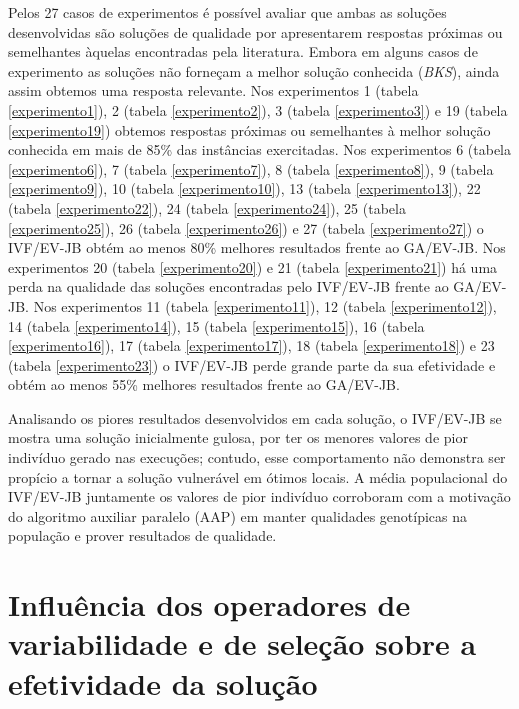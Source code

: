 \documentclass[relatorio,nocolorlinks]{inf-ufg}
\begin{document}
Pelos 27 casos de experimentos \'{e} poss\'{i}vel avaliar que ambas as solu\c{c}\~{o}es desenvolvidas s\~{a}o solu\c{c}\~{o}es de qualidade por
apresentarem respostas pr\'{o}ximas ou semelhantes \`{a}quelas encontradas pela literatura. Embora em alguns casos de experimento as solu\c{c}\~{o}es
n\~{a}o forne\c{c}am a melhor solu\c{c}\~{a}o conhecida (\textit{BKS}), ainda assim obtemos uma resposta relevante. Nos experimentos 1 (tabela
\ref{experimento1}), 2 (tabela \ref{experimento2}), 3 (tabela \ref{experimento3}) e 19 (tabela \ref{experimento19}) obtemos respostas pr\'{o}ximas
ou semelhantes \`{a} melhor solu\c{c}\~{a}o conhecida em mais de 85\% das inst\^{a}ncias exercitadas. Nos experimentos 6 (tabela \ref{experimento6}),
7 (tabela \ref{experimento7}), 8 (tabela \ref{experimento8}), 9 (tabela \ref{experimento9}), 10 (tabela \ref{experimento10}), 13 (tabela
\ref{experimento13}), 22 (tabela \ref{experimento22}), 24 (tabela \ref{experimento24}), 25 (tabela \ref{experimento25}), 26 (tabela
\ref{experimento26}) e 27 (tabela \ref{experimento27}) o IVF/EV-JB obt\'{e}m ao menos 80\% melhores resultados frente ao GA/EV-JB. Nos experimentos
20 (tabela \ref{experimento20}) e 21 (tabela \ref{experimento21}) h\'{a} uma perda na qualidade das solu\c{c}\~{o}es encontradas pelo IVF/EV-JB
frente ao GA/EV-JB. Nos experimentos 11 (tabela \ref{experimento11}), 12 (tabela \ref{experimento12}), 14 (tabela \ref{experimento14}), 15 (tabela
\ref{experimento15}), 16 (tabela \ref{experimento16}), 17 (tabela \ref{experimento17}), 18 (tabela \ref{experimento18}) e 23 (tabela
\ref{experimento23}) o IVF/EV-JB perde grande parte da sua efetividade e obt\'{e}m ao menos 55\% melhores resultados frente ao GA/EV-JB.

Analisando os piores resultados desenvolvidos em cada solu\c{c}\~{a}o, o IVF/EV-JB se mostra uma solu\c{c}\~{a}o inicialmente gulosa, por ter os
menores valores de pior indiv\'{i}duo gerado nas execu\c{c}\~{o}es; contudo, esse comportamento n\~{a}o demonstra ser prop\'{i}cio a tornar a
solu\c{c}\~{a}o vulner\'{a}vel em \'{o}timos locais. A m\'{e}dia populacional do IVF/EV-JB juntamente os valores de pior indiv\'{i}duo corroboram
com a motiva\c{c}\~{a}o do algoritmo auxiliar paralelo (AAP) em manter qualidades genot\'{i}picas na popula\c{c}\~{a}o e prover resultados de
qualidade.

\section{Influ\^{e}ncia dos operadores de variabilidade e de sele\c{c}\~{a}o sobre a efetividade da solu\c{c}\~{a}o}
\end{document}
